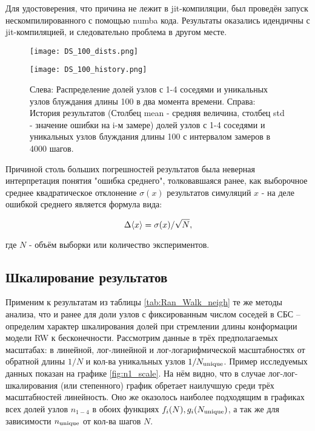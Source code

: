 Для удостоверения, что причина не лежит в jit-компиляции, был проведён запуск нескомпилированного с помощью numba кода. Результаты оказались идендичны с jit-компиляцией, и следовательно проблема в другом месте.

\begin{figure}
	\caption{Слева: Распределение долей узлов с 1-4 соседями и уникальных узлов блуждания длины 100 в два момента времени. Справа: История результатов (Столбец mean - средняя величина, столбец std - значение ошибки на i-м замере) долей узлов с 1-4 соседями и уникальных узлов блуждания длины 100 с интервалом замеров в 4000 шагов.}
     \label{fig:DS_100_dists_history}
\begin{minipage}{0.32\textwidth}
     \texttt{[image: DS\_100\_dists.png]}
\end{minipage}
\begin{minipage}{0.67\textwidth}
     \texttt{[image: DS\_100\_history.png]}
\end{minipage}
	
\end{figure}


Причиной столь больших погрешностей результатов была неверная интерпретация понятия "ошибка среднего", толковавшаяся ранее, как выборочное среднее квадратическое отклонение $\sigma(x)$ результатов симуляций $x$ - на деле ошибкой среднего является формула вида:

\[\Delta\langle x \rangle = \sigma(x)/\sqrt{N},\]

где  $N$ - объём выборки или количество экспериментов.


\subsection{Шкалирование результатов}

Применим к результатам из таблицы \ref{tab:Ran_Walk_neigh} те же методы анализа, что и ранее для доли узлов с фиксированным числом соседей в СБС -- определим характер шкалирования долей при стремлении длины конформации модели RW к бесконечности.
Рассмотрим данные в трёх предполагаемых масштабах: в линейной, лог-линейной и лог-логарифмической масштабностях от обратной длины $1/N$ и кол-ва уникальных узлов $1/N_{\textup{unique}}$.
Пример исследуемых данных показан на графике \ref{fig:n1_scale}. 
На нём видно, что в случае лог-лог-шкалирования (или степенного) график обретает наилучшую среди трёх масштабностей линейность.
Оно же оказолось наиболее подходящим в графиках всех долей узлов $n_{1-4}$ в обоих функциях $f_i(N), g_i(N_{\textup{unique}})$, а так же для зависимости $n_{\textup{unique}}$ от кол-ва шагов $N$.


